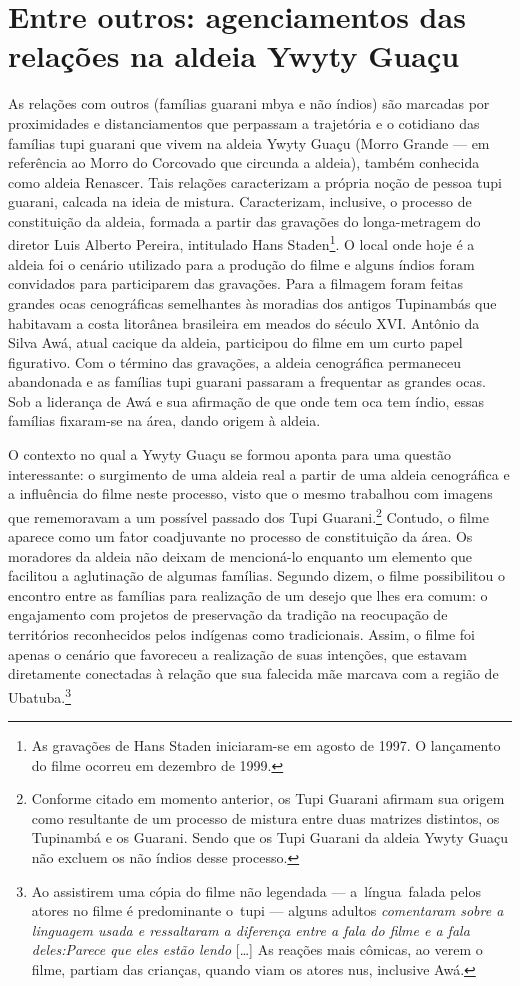 \section{Entre outros: agenciamentos das relações na aldeia Ywyty Guaçu} 

As relações com outros (famílias guarani mbya e não índios) são marcadas
por proximidades e distanciamentos que perpassam a trajetória e o
cotidiano das famílias tupi guarani que vivem na aldeia Ywyty Guaçu
(Morro Grande — em referência ao Morro do Corcovado que circunda a
aldeia), também conhecida como aldeia Renascer. Tais relações
caracterizam a própria noção de pessoa tupi guarani, calcada na ideia
de mistura. Caracterizam, inclusive, o processo de constituição da
aldeia, formada a partir das gravações do longa-metragem do diretor
Luis Alberto Pereira, intitulado Hans Staden\footnote{As gravações de
Hans Staden iniciaram-se em agosto de 1997. O lançamento do filme
ocorreu em dezembro de 1999.}. O local onde hoje é a aldeia foi o
cenário utilizado para a produção do filme e alguns índios foram
convidados para participarem das gravações. Para a filmagem foram
feitas grandes ocas cenográficas semelhantes às moradias dos antigos
Tupinambás que habitavam a costa litorânea brasileira em meados do
século XVI. Antônio da Silva Awá, atual cacique da aldeia, participou
do filme em um curto papel figurativo. Com o término das gravações, a
aldeia cenográfica permaneceu abandonada e as famílias tupi guarani
passaram a frequentar as grandes ocas. Sob a liderança de Awá e sua
afirmação de que onde tem oca tem índio, essas famílias fixaram-se na
área, dando origem à aldeia.

O contexto no qual a Ywyty Guaçu se formou aponta para uma questão
interessante: o surgimento de uma aldeia real a partir de uma aldeia
cenográfica e a influência do filme neste processo, visto que o mesmo
trabalhou com imagens que rememoravam a um possível passado dos Tupi
Guarani.\footnote{Conforme citado em momento anterior, os Tupi Guarani
afirmam sua origem como resultante de um processo de mistura entre duas
matrizes distintos, os Tupinambá e os Guarani. Sendo que os Tupi
Guarani da aldeia Ywyty Guaçu não excluem os não índios desse
processo.} Contudo, o filme aparece como um fator coadjuvante no
processo de constituição da área. Os moradores da aldeia não deixam de
mencioná-lo enquanto um elemento que facilitou a aglutinação de algumas
famílias. Segundo dizem, o filme possibilitou o encontro entre as
famílias para realização de um desejo que lhes era comum: o engajamento
com projetos de preservação da tradição na reocupação de territórios
reconhecidos pelos indígenas como tradicionais. Assim, o filme foi
apenas o cenário que favoreceu a realização de suas intenções, que
estavam diretamente conectadas à relação que sua falecida mãe marcava
com a região de Ubatuba.\footnote{Ao assistirem uma cópia do filme não
legendada — a~língua~falada pelos atores no filme é predominante o~tupi
— alguns adultos \emph{comentaram sobre a linguagem usada e ressaltaram
a diferença entre a fala do filme e a fala deles:}\emph{Parece que
eles estão lendo} [\ldots{}] As reações mais cômicas, ao verem o filme, partiam
das crianças, quando viam os atores nus, inclusive Awá.}

